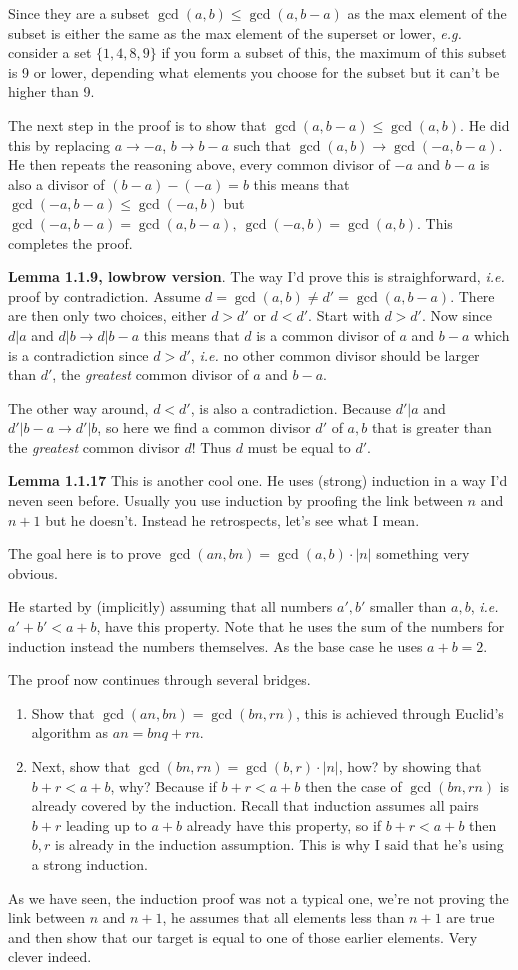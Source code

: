 \documentclass[aps,preprint,preprintnumbers,nofootinbib,showpacs,prd]{revtex4-1}
\newcommand{\ie}{{\it i.e.} }
\newcommand{\eg}{{\it e.g.} }
\begin{document}
Since they are a subset $\gcd(a,b) \le \gcd(a,b-a)$ as the max element of the subset is either the same as the max element of the superset or lower, \eg consider a set $\{1,4,8,9\}$ if you form a subset of this, the maximum of this subset is 9 or lower, depending what elements you choose for the subset but it can't be higher than 9.

The next step in the proof is to show that $\gcd(a,b-a) \le \gcd(a,b)$. He did this by replacing $a \to -a$, $b \to b-a$ such that $\gcd(a,b) \to \gcd(-a, b-a)$. He then repeats the reasoning above, every common divisor of $-a$ and $b-a$ is also a divisor of $(b-a) - (-a) = b$ this means that $\gcd(-a,b-a) \le \gcd(-a,b)$ but $\gcd(-a,b-a) = \gcd(a, b-a),~\gcd(-a,b) = \gcd(a,b)$. This completes the proof.

{\bf Lemma 1.1.9, lowbrow version}. The way I'd prove this is straighforward, \ie proof by contradiction. Assume $d = \gcd(a,b) \neq d' = \gcd(a, b-a)$. There are then only two choices, either $d > d'$ or $d < d'$. Start with $d > d'$. Now since $d|a$ and $d|b \to d | b-a$ this means that $d$ is a common divisor of $a$ and $b-a$ which is a contradiction since $d > d'$, \ie no other common divisor should be larger than $d'$, the {\it greatest} common divisor of $a$ and $b-a$.

The other way around, $d < d'$, is also a contradiction. Because $d'|a$ and $d'|b-a \to d'|b$, so here we find a common divisor $d'$ of $a,b$ that is greater than the {\it greatest} common divisor $d$! Thus $d$ must be equal to $d'$.

{\bf Lemma 1.1.17} This is another cool one. He uses (strong) induction in a way I'd neven seen before. Usually you use induction by proofing the link between $n$ and $n+1$ but he doesn't. Instead he retrospects, let's see what I mean.

The goal here is to prove $\gcd(an,bn) = \gcd(a,b) \cdot |n|$ something very obvious.

He started by (implicitly) assuming that all numbers $a',b'$ smaller than $a,b$, \ie $a'+b' < a+b$, have this property. Note that he uses the sum of the numbers for induction instead the numbers themselves. As the base case he uses $a + b = 2$.

The proof now continues through several bridges. 
\begin{enumerate}
\item Show that $\gcd(an,bn) = \gcd(bn,rn)$, this is achieved through Euclid's algorithm as $an = bnq + rn$.
\item Next, show that $\gcd(bn, rn) = \gcd(b,r) \cdot |n|$, how? by showing that $b + r < a + b$, why? Because if $b + r < a + b$ then the case of $\gcd(bn, rn)$ is already covered by the induction. Recall that induction assumes all pairs $b + r$ leading up to $a + b$ already have this property, so if $b + r < a + b$ then $b,r$ is already in the induction assumption. This is why I said that he's using a strong induction.
\end{enumerate}
As we have seen, the induction proof was not a typical one, we're not proving the link between $n$ and $n+1$, he assumes that all elements less than $n+1$ are true and then show that our target is equal to one of those earlier elements. Very clever indeed.
\end{document}
